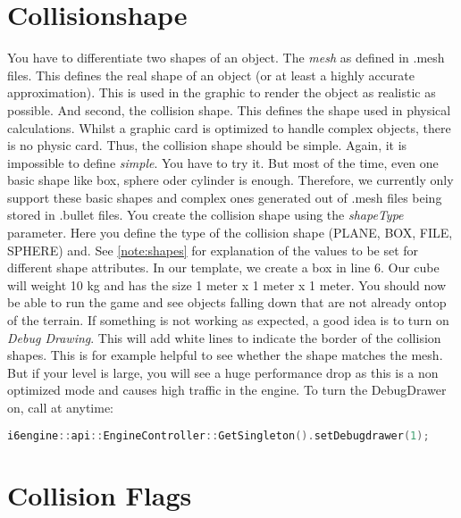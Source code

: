 \documentclass{article}
\begin{document}
\section{Collisionshape}

You have to differentiate two shapes of an object. The \textit{mesh} as defined in .mesh files. This defines the real shape of an object (or at least a highly accurate approximation). This is used in the graphic to render the object as realistic as possible. And second, the collision shape. This defines the shape used in physical calculations. Whilst a graphic card is optimized to handle complex objects, there is no physic card. Thus, the collision shape should be simple. Again, it is impossible to define \textit{simple}. You have to try it. But most of the time, even one basic shape like box, sphere oder cylinder is enough. Therefore, we currently only support these basic shapes and complex ones generated out of .mesh files being stored in .bullet files. You create the collision shape using the \textit{shapeType} parameter. Here you define the type of the collision shape (PLANE, BOX, FILE, SPHERE) and. See \ref{note:shapes} for explanation of the values to be set for different shape attributes. In our template, we create a box in line 6. Our cube will weight 10 kg and has the size 1 meter x 1 meter x 1 meter.\newline
You should now be able to run the game and see objects falling down that are not already ontop of the terrain. If something is not working as expected, a good idea is to turn on \textit{Debug Drawing}. This will add white lines to indicate the border of the collision shapes. This is for example  helpful to see whether the shape matches the mesh. But if your level is large, you will see a huge performance drop as this is a non optimized mode and causes high traffic in the engine. To turn the DebugDrawer on, call at anytime:
\begin{lstlisting}[language=C++, style=basic, caption={enabling debug drawer}, label=code:load]
i6engine::api::EngineController::GetSingleton().setDebugdrawer(1);
\end{lstlisting}

\section{Collision Flags}
\end{document}
